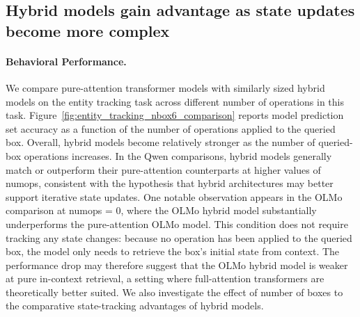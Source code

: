 \documentclass{article}
\begin{document}


\subsection{Hybrid models gain advantage as state updates become more complex}

\paragraph{Behavioral Performance.}
We compare pure-attention transformer models with similarly sized hybrid models on the entity tracking task across different number of operations in this task. Figure~\ref{fig:entity_tracking_nbox6_comparison} reports model prediction set accuracy as a function of the number of operations applied to the queried box. Overall, hybrid models become relatively stronger as the number of queried-box operations increases. In the Qwen comparisons, hybrid models generally match or outperform their pure-attention counterparts at higher values of numops, consistent with the hypothesis that hybrid architectures may better support iterative state updates.  One notable observation appears in the OLMo comparison at numops = 0, where the OLMo hybrid model substantially underperforms the pure-attention OLMo model. This condition does not require tracking any state changes: because no operation has been applied to the queried box, the model only needs to retrieve the box’s initial state from context. The performance drop may therefore suggest that the OLMo hybrid model is weaker at pure in-context retrieval, a setting where full-attention transformers are theoretically better suited. We also investigate the effect of number of boxes to the comparative state-tracking advantages of hybrid models. 
\end{document}
